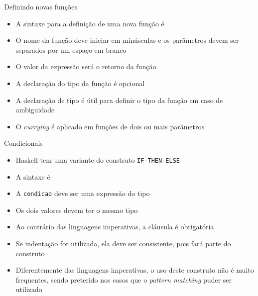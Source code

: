 \begin{frame}[fragile]{Definindo novas funções}

    \begin{itemize}
        \item A sintaxe para a definição de uma nova função é


        \item O nome da função deve iniciar em minúsculas e os parâmetros devem ser separados
            por um espaço em branco

        \item O valor da expressão será o retorno da função

        \item A declaração do tipo da função é opcional


        \item A declaração de tipo é útil para definir o tipo da função em caso de ambiguidade

        \item O \textit{currying} é aplicado em funções de dois ou mais parâmetros 

    \end{itemize}

\end{frame}

\begin{frame}[fragile]{Condicionais}

    \begin{itemize}
        \item Haskell tem uma variante do construto \texttt{IF-THEN-ELSE}

        \item A sintaxe é 


        \item A \texttt{condicao} deve ser uma expressão do tipo 

        \item Os dois valores devem ter o mesmo tipo

        \item Ao contrário das linguagens imperativas, a cláusula  é 
            obrigatória

        \item Se indentação for utilizada, ela deve ser consistente, pois fará parte
            do construto

        \item Diferentemente das linguagens imperativas, o uso deste construto não é muito
            frequentes, sendo preterido nos casos que o \textit{pattern matching} puder ser
            utilizado
    \end{itemize}

\end{frame}

